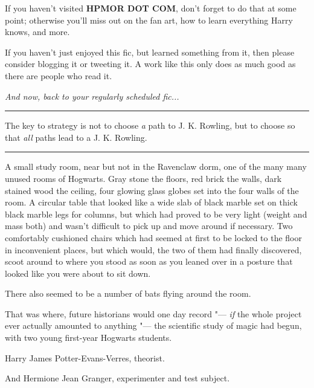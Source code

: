 If you haven't visited \textbf{HPMOR DOT COM}, don't forget to do that
at some point; otherwise you'll miss out on the fan art, how to learn
everything Harry knows, and more.

If you haven't just enjoyed this fic, but learned something from it,
then please consider blogging it or tweeting it. A work like this only
does as much good as there are people who read it.

\emph{And now, back to your regularly scheduled fic...}

\begin{center}\rule{3in}{0.4pt}\end{center}

The key to strategy is not to choose \emph{a} path to J. K. Rowling, but
to choose so that \emph{all} paths lead to a J. K. Rowling.

\begin{center}\rule{3in}{0.4pt}\end{center}

A small study room, near but not in the Ravenclaw dorm, one of the many
many unused rooms of Hogwarts. Gray stone the floors, red brick the
walls, dark stained wood the ceiling, four glowing glass globes set into
the four walls of the room. A circular table that looked like a wide
slab of black marble set on thick black marble legs for columns, but
which had proved to be very light (weight and mass both) and wasn't
difficult to pick up and move around if necessary. Two comfortably
cushioned chairs which had seemed at first to be locked to the floor in
inconvenient places, but which would, the two of them had finally
discovered, scoot around to where you stood as soon as you leaned over
in a posture that looked like you were about to sit down.

There also seemed to be a number of bats flying around the room.

That was where, future historians would one day record "--- \emph{if} the
whole project ever actually amounted to anything "--- the scientific study
of magic had begun, with two young first-year Hogwarts students.

Harry James Potter-Evans-Verres, theorist.

And Hermione Jean Granger, experimenter and test subject.

